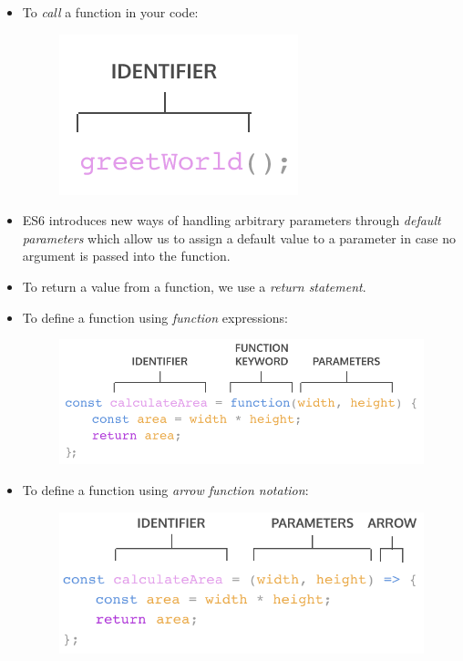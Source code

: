 \documentclass[11pt]{article}
\begin{document}
\begin{itemize}[leftmargin = *]
\begin{figure}[H]
\centering
\end{figure}
\item To \textit{call} a function in your code:
\vspace{-2mm}
\begin{figure}[H]
\includegraphics[scale = 0.65]{4_2}
\centering
\end{figure}
\item ES6 introduces new ways of handling arbitrary parameters through \textit{default parameters} which allow us to assign a default value to a parameter in case no argument is passed into the function.
\item To return a value from a function, we use a \textit{return statement}.
\item To define a function using \textit{function} expressions:
\begin{figure}[H]
\includegraphics[scale = 0.73]{4_8}
\centering
\end{figure}
\item To define a function using \textit{arrow function notation}:
\begin{figure}[H]
\includegraphics[scale = 0.8]{4_11}

\end{figure}
\end{itemize}
\end{document}
